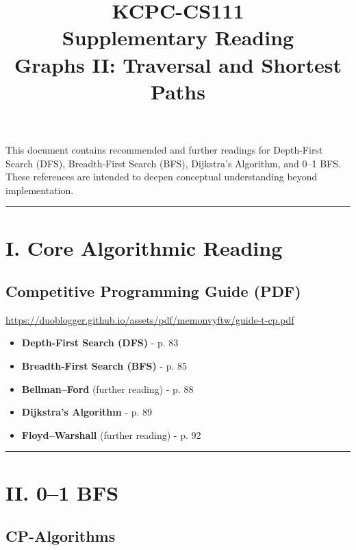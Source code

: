 \documentclass[11pt]{article}
\title{KCPC-CS111 \\ Supplementary Reading \\ Graphs II: Traversal and Shortest Paths}
\author{}
\date{}
\begin{document}
\maketitle

\noindent
This document contains recommended and further readings for Depth-First Search (DFS), Breadth-First Search (BFS), Dijkstra’s Algorithm, and 0--1 BFS.  
These references are intended to deepen conceptual understanding beyond implementation.

\hrule
\vspace{1em}

\section*{I. Core Algorithmic Reading}

\subsection*{Competitive Programming Guide (PDF)}

\url{https://duoblogger.github.io/assets/pdf/memonvyftw/guide-t-cp.pdf}

\vspace{0.8em}

\begin{itemize}
    \item \textbf{Depth-First Search (DFS)} - p. 83
    \item \textbf{Breadth-First Search (BFS)} - p. 85
    \item \textbf{Bellman--Ford} (further reading) - p. 88
    \item \textbf{Dijkstra’s Algorithm} - p. 89
    \item \textbf{Floyd--Warshall} (further reading) - p. 92
\end{itemize}

\vspace{1em}
\hrule
\vspace{1em}

\section*{II. 0--1 BFS}

\subsection*{CP-Algorithms}
\end{document}
